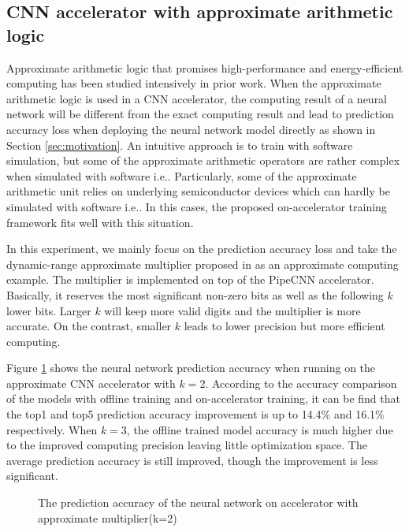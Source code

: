 \subsection{CNN accelerator with approximate arithmetic logic}
Approximate arithmetic logic that promises high-performance and energy-efficient computing has 
been studied intensively in prior work. When the approximate arithmetic logic 
is used in a CNN accelerator, the computing result of a neural network will be different 
from the exact computing result and lead to prediction accuracy loss when deploying 
the neural network model directly as shown in Section \ref{sec:motivation}. 
An intuitive approach is to train with software simulation, but some of the approximate arithmetic 
operators are rather complex when simulated with software i.e.\cite{appro_45}. Particularly, some of the 
approximate arithmetic unit relies on underlying semiconductor devices which 
can hardly be simulated with software i.e.\cite{appro_46}. In this cases, the proposed on-accelerator 
training framework fits well with this situation. 

In this experiment, we mainly focus on the prediction accuracy loss and 
take the dynamic-range approximate multiplier proposed in \cite{Approximate_Multiplier_31} as 
an approximate computing example. The multiplier is implemented on top of the PipeCNN
accelerator. Basically, it reserves the most significant non-zero bits as well as the 
following $k$ lower bits. Larger $k$ will keep more valid digits and the multiplier 
is more accurate. On the contrast, smaller $k$ leads to lower precision but 
more efficient computing. 

Figure \ref{fig:k2-approximate-multiplier} shows the 
neural network prediction accuracy when running on the approximate CNN 
accelerator with $k=2$. According to the accuracy comparison of the models with 
offline training and on-accelerator training, it can be find that the 
top1 and top5 prediction accuracy improvement is up to 14.4\% and 16.1\% respectively. 
When $k=3$, the offline trained model accuracy is much higher due to the improved 
computing precision leaving little optimization space. The average prediction 
accuracy is still improved, though the improvement is less significant.
\begin{figure}
        \center
        \qquad
        \caption{The prediction accuracy of the neural network on accelerator with approximate multiplier(k=2)}
        \label{fig:k2-approximate-multiplier}
\end{figure}

